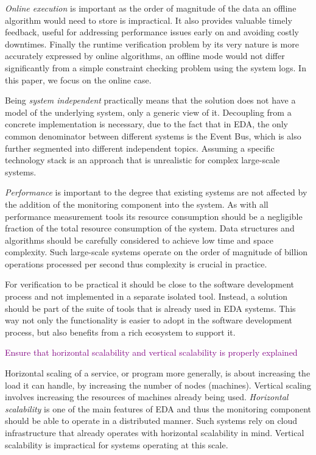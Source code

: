 \documentclass[twocolumn]{article}
\newcommand{\note}[1] {
	\textcolor{Purple}{#1}

}
\begin{document}
\par
\emph{Online execution} is important as the order of magnitude of the data an offline algorithm would need to store is impractical.
It also provides valuable timely feedback, useful for addressing performance issues early on and avoiding costly downtimes.
Finally the runtime verification problem by its very nature is more accurately expressed by online algorithms, an offline mode
would not differ significantly from a simple constraint checking problem using the system logs. In this paper, we focus on the online case.
\par
Being \emph{system independent} practically means that the solution does not have a model of the underlying system, only a generic view of it.
Decoupling from a concrete implementation is necessary, due to the fact that in EDA, the only common denominator between different systems
is the Event Bus, which is also further segmented into different independent topics. Assuming a specific technology stack is an approach that
is unrealistic for complex large-scale systems.
\par
\emph{Performance} is important to the degree that existing systems are not affected by the addition of the monitoring component into the system.
As with all performance measurement tools its resource consumption should be a negligible fraction of the total resource consumption of the system.
Data structures and algorithms should be carefully considered to achieve low time and space complexity. Such large-scale systems operate on the order
of magnitude of billion operations processed per second thus complexity is crucial in practice.
\par
For verification to be practical it should be close to the software development process and not implemented in a separate isolated tool.
Instead, a solution should be part of the suite of tools that is already used in EDA systems. This way not only the functionality is
easier to adopt in the software development process, but also benefits from a rich ecosystem to support it.


\note{Ensure that horizontal scalability and vertical scalability is properly explained}
\par
Horizontal scaling of a service, or program more generally, is about increasing the load it can handle,
by increasing the number of nodes (machines).
Vertical scaling involves increasing the resources of machines already being used.
\emph{Horizontal scalability} is one of the main features of EDA and thus the monitoring component should be able to operate in a distributed manner. Such systems rely on cloud infrastructure that already operates with horizontal scalability in mind.
Vertical scalability is impractical for systems operating at this scale.
\end{document}

